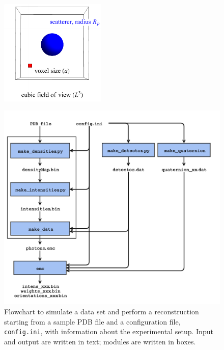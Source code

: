 \documentclass[]{iucr}              %
\begin{document}
\begin{figure}
\includegraphics[width=0.45\textwidth]{figures/geometry3.pdf} 
\label{fig:expGeometry}
\end{figure}

\begin{figure}
\caption{Flowchart to simulate a data set and perform a reconstruction starting from a sample PDB file and a configuration file, \texttt{config.ini}, with information about the experimental setup. Input and output are written in text; modules are written in boxes.}\label{fig:simFlowchart}
\includegraphics[width=\textwidth]{figures/emc_sim.pdf}
\end{figure}
\end{document}
